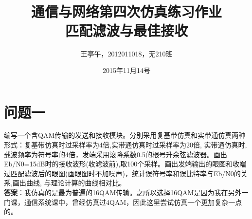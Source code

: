 \documentclass{article}
\begin{document}
\title{通信与网络第四次仿真练习作业\\匹配滤波与最佳接收 }
\author{王亭午，2012011018，无210班}
\date{2015年11月14号}
\maketitle
\section{问题一}
编写一个含QAM传输的发送和接收模块。分别采用复基带仿真和实带通仿真两种形式：复基带仿真时过采样率为4倍,实带通仿真时过采样率为20倍, 实带通仿真时, 载波频率为符号率的4倍，发端采用滚降系数0.5的根号升余弦滤波器。画出Eb/N0=15dB时的接收波形(收滤波前),取100个采样。画出发端输出的眼图和收端过匹配滤波后的眼图(画眼图时不加噪声)，统计误符号率和误比特率与Eb/N0的关系,画出曲线, 与理论计算的曲线相对比。\\
\textbf{答案}：我仿真的是最为普遍的16QAM传输。之所以选择16QAM是因为我在另外一门课，通信系统课中，曾经仿真过4QAM，因此这里尝试仿真一个更加复杂一点的。
\end{document}
